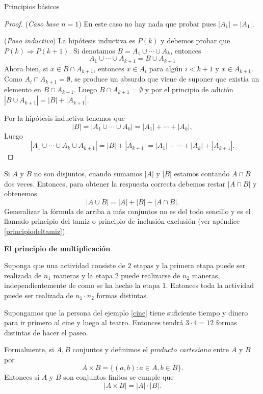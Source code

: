 \begin{section}{Principios básicos}
\begin{proof}
\noindent({\em Caso base $n=1$}) En este caso no hay nada que probar pues  $|A_1|=|A_1|$.

\noindent({\em Paso inductivo}) La hipótesis inductiva es $P(k)$ y debemos probar que $P(k) \Rightarrow P(k+1)$. Si denotamos $B = A_1 \cup \cdots \cup A_k$, entonces 
$$
A_1 \cup \cdots \cup A_{k+1} = B \cup A_{k+1}
$$
Ahora bien, si $x \in B \cap A_{k+1}$, entonces $x \in A_i$ para algún $i < k+1$ y $x \in A_{k+1}$. Como $A_{i} \cap A_{k+1} = \emptyset$, se produce un absurdo  que viene de suponer que existía un elemento en $B \cap A_{k+1}$. Luego   $B \cap A_{k+1}= \emptyset$ y por el principio de adición  $|B \cup A_{k+1}| = |B|+|A_{k+1}|$. 

Por la hipótesis inductiva tenemos que 
$$
|B| = |A_1 \cup \cdots \cup A_k| =|A_1|+\cdots+|A_k|,
$$
Luego
$$
|A_1 \cup \cdots \cup A_k \cup  A_{k+1}| = |B|+|A_{k+1}| = |A_1|+\cdots+|A_k|+|A_{k+1}|.
$$
\end{proof}



Si $A$ y $B$ no son disjuntos, cuando sumamos $|A|$ y $|B|$ estamos contando $A \cap B$ dos veces. Entonces, para
obtener la respuesta correcta debemos restar $|A \cap B|$ y obtenemos
$$
|A \cup B| = |A|+|B| - |A \cap B|.
$$
Generalizar la fórmula de arriba a más conjuntos no es del todo sencillo y es el  llamado principio del tamiz o principio de inclusión-exclusión (ver apéndice \ref{principiodeltamiz}). 



\noindent\textbf{El principio de multiplicación}

Suponga que una actividad consiste de $2$ etapas y la primera etapa puede ser realizada de $n_1$ maneras y la etapa $2$  puede realizarse de $n_2$  maneras, independientemente de como se ha hecho la etapa $1$. Entonces toda la actividad puede ser realizada de $n_1\cdot n_2$  formas distintas.


\begin{ejemplo}
Supongamos que la persona del ejemplo \ref{cine} tiene suficiente tiempo y dinero para ir primero al cine y luego al teatro. Entonces tendrá  $3 \cdot 4=12$ formas distintas de hacer el paseo.
\end{ejemplo}


Formalmente, si $A,B$ conjuntos y definimos el {\em producto cartesiano} entre $A$ y $B$ por
$$
A \times B = \{(a,b): a \in A, b \in B\}.
$$
Entonces si $A$ y $B$ son conjuntos finitos se cumple que
$$
|A \times B| = |A|\cdot|B|.  
$$

\end{section}

